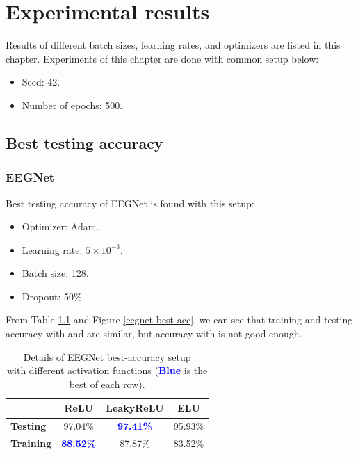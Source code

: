 \chapter{Experimental results}
\indent
	Results of different batch sizes, learning rates, and optimizers are listed in this chapter.
	Experiments of this chapter are done with common setup below: 
	\begin{itemize}
		\item Seed: 42.
		\item Number of epochs: 500.
	\end{itemize} 

\section{Best testing accuracy}
\subsection{EEGNet}
	Best testing accuracy of EEGNet is found with this setup: 
	\begin{itemize}
		\item Optimizer: Adam.
		\item Learning rate: $5 \times 10^{-3}$.
		\item Batch size: 128.
		\item Dropout: 50\%.
	\end{itemize} 
	From Table \ref{eegnet-best-acc-table} and Figure \ref{eegnet-best-acc}, 
	we can see that training and testing accuracy with  and  are similar, 
	but accuracy with  is not good enough.

	\begin{table}[htbp]
		\centering
		\begin{tabular}{l|ccc}
			\hline
			\diagbox{Accurcy}{Activation} & ReLU & LeakyReLU & ELU \\ 
			\hline
			\textbf{Testing} & 97.04\% & \textcolor{blue}{\textbf{97.41\%}} & 95.93\% \\ 
			\textbf{Training} & \textcolor{blue}{\textbf{88.52\%}} & 87.87\% & 83.52\% \\ 
			\hline
		\end{tabular}
		\caption{Details of EEGNet best-accuracy setup \\ with different activation functions (\textcolor{blue}{\textbf{Blue}} is the best of each row).}
		\label{eegnet-best-acc-table}
	\end{table}

